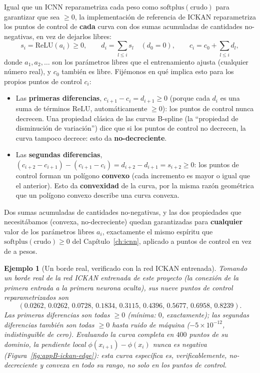 \documentclass[11pt,a4paper]{article}
\newtheorem{ejemplo}{Ejemplo}
\begin{document}
Igual que un ICNN reparametriza cada peso como
$\mathrm{softplus}(\text{crudo})$ para garantizar que sea $\geq0$, la
implementaci\'on de referencia de ICKAN reparametriza los puntos de
control de \textbf{cada} curva con dos sumas acumuladas de cantidades
no-negativas, en vez de dejarlos libres:
\[
 s_i=\mathrm{ReLU}(a_i)\geq0,\qquad
 d_i=\sum_{l\leq i}s_l\quad(d_0=0),\qquad
 c_i=c_0+\sum_{l\leq i}d_l,
\]
donde $a_1,a_2,\dots$ son los par\'ametros libres que el entrenamiento
ajusta (cualquier n\'umero real), y $c_0$ tambi\'en es libre. Fij\'emonos
en qu\'e implica esto para los propios puntos de control $c_i$:
\begin{itemize}
\item Las \textbf{primeras diferencias}, $c_{i+1}-c_i=d_{i+1}\geq0$
(porque cada $d_i$ es una suma de t\'erminos $\mathrm{ReLU}$,
autom\'aticamente $\geq0$): los puntos de control nunca decrecen. Una
propiedad cl\'asica de las curvas B-spline (la ``propiedad de
disminuci\'on de variaci\'on'') dice que si los puntos de control no
decrecen, la curva tampoco decrece: esto da \textbf{no-decreciente}.
\item Las \textbf{segundas diferencias},
$(c_{i+2}-c_{i+1})-(c_{i+1}-c_i)=d_{i+2}-d_{i+1}=s_{i+2}\geq0$: los
puntos de control forman un pol\'igono \textbf{convexo} (cada
incremento es mayor o igual que el anterior). Esto da
\textbf{convexidad} de la curva, por la misma raz\'on geom\'etrica que
un pol\'igono convexo describe una curva convexa.
\end{itemize}
Dos sumas acumuladas de cantidades no-negativas, y las dos propiedades
que necesit\'abamos (convexa, no-decreciente) quedan garantizadas para
\textbf{cualquier} valor de los par\'ametros libres $a_i$, exactamente
el mismo esp\'iritu que $\mathrm{softplus}(\text{crudo})\geq0$ del
Cap\'itulo~\ref{ch:icnn}, aplicado a puntos de control en vez de a
pesos.

\begin{ejemplo}[Un borde real, verificado con la red ICKAN entrenada]
\label{ex:appB-ickan-edge}
Tomando un borde real de la red ICKAN entrenada de este proyecto (la
conexi\'on de la primera entrada a la primera neurona oculta), sus
nueve puntos de control reparametrizados son
\[
 (0.0262,\,0.0262,\,0.0728,\,0.1834,\,0.3115,\,0.4396,\,0.5677,\,0.6958,\,0.8239).
\]
Las primeras diferencias son todas $\geq0$ (m\'inima: $0$, exactamente);
las segundas diferencias tambi\'en son todas $\geq0$ hasta ruido de
m\'aquina ($-5\times10^{-12}$, indistinguible de cero). Evaluando la
curva completa en $400$ puntos de su dominio, la pendiente local
$\phi(x_{i+1})-\phi(x_i)$ nunca es negativa (Figura~\ref{fig:appB-ickan-edge}):
esta curva espec\'ifica es, verificablemente, no-decreciente y convexa
en todo su rango, no solo en los puntos de control.
\end{ejemplo}
\end{document}

